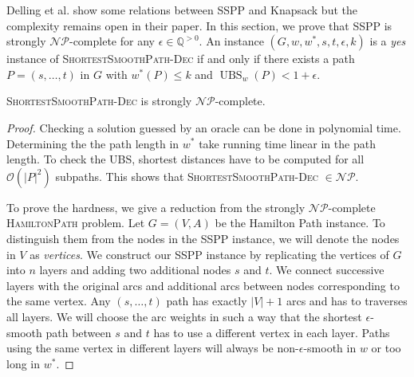 \documentclass[a4paper,UKenglish,cleveref, autoref, thm-restate]{lipics-v2021}
\newcommand*{\ubs}{\operatorname{UBS}}
\begin{document}
Delling et al. show some relations between SSPP and Knapsack but the complexity remains open in their paper.
In this section, we prove that SSPP is strongly $\mathcal{NP}$-complete for any $\epsilon \in \mathbb{Q}^{>0}$.
An instance $(G, w, w^*, s, t, \epsilon, k)$ is a \emph{yes} instance of \textsc{ShortestSmoothPath-Dec} if and only if there exists a path $P = (s,\dots, t)$ in $G$ with $w^*(P) \leq k$ and $\ubs_w(P) < 1 + \epsilon$.

\begin{theorem}
\textsc{ShortestSmoothPath-Dec} is strongly $\mathcal{NP}$-complete.
\end{theorem}

\begin{proof}
Checking a solution guessed by an oracle can be done in polynomial time.
Determining the the path length in $w^*$ take running time linear in the path length.
To check the UBS, shortest distances have to be computed for all $\mathcal{O}(|P|^2)$ subpaths.
This shows that \textsc{ShortestSmoothPath-Dec} $\in \mathcal{NP}$.

To prove the hardness, we give a reduction from the strongly $\mathcal{NP}$-complete \textsc{HamiltonPath} problem.
Let $G=(V,A)$ be the Hamilton Path instance.
To distinguish them from the nodes in the SSPP instance, we will denote the nodes in $V$ as \emph{vertices}.
We construct our SSPP instance by replicating the vertices of $G$ into $n$ layers and adding two additional nodes $s$ and $t$.
We connect successive layers with the original arcs and additional arcs between nodes corresponding to the same vertex.
Any $(s,\dots,t)$ path has exactly $|V|+1$ arcs and has to traverses all layers.
We will choose the arc weights in such a way that the shortest $\epsilon$-smooth path between $s$ and $t$ has to use a different vertex in each layer.
Paths using the same vertex in different layers will always be non-$\epsilon$-smooth in $w$ or too long in $w^*$.


\end{proof}
\end{document}

